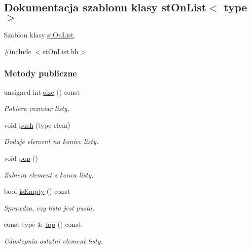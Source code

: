 \hypertarget{classst_on_list}{\subsection{Dokumentacja szablonu klasy st\-On\-List$<$ type $>$}
\label{classst_on_list}
}


Szablon klasy \hyperlink{classst_on_list}{st\-On\-List}.  




{\ttfamily \#include $<$st\-On\-List.\-hh$>$}

\subsubsection*{Metody publiczne}
\begin{DoxyCompactItemize}
\item 
unsigned int \hyperlink{classst_on_list_a3031caff03abeefeb3afee00490a4db1}{size} () const 
\begin{DoxyCompactList}\small\item\em Pobiera rozmiar listy. \end{DoxyCompactList}\item 
void \hyperlink{classst_on_list_a7bb86d7f9819e69fd3a400f3dce3c785}{push} (type elem)
\begin{DoxyCompactList}\small\item\em Dodaje element na koniec listy. \end{DoxyCompactList}\item 
void \hyperlink{classst_on_list_ab5bc1dfbd35b6149ca820bb7f925a710}{pop} ()
\begin{DoxyCompactList}\small\item\em Zabiera element z konca listy. \end{DoxyCompactList}\item 
bool \hyperlink{classst_on_list_a3bffc5bfbc501198922ac6cebcbcf846}{is\-Empty} () const 
\begin{DoxyCompactList}\small\item\em Sprawdza, czy lista jest pusta. \end{DoxyCompactList}\item 
const type \& \hyperlink{classst_on_list_ae506d091a7de8ea2f33c5cb4aaa02a9a}{top} () const 
\begin{DoxyCompactList}\small\item\em Udostepnia ostatni element listy. \end{DoxyCompactList}\end{DoxyCompactItemize}
